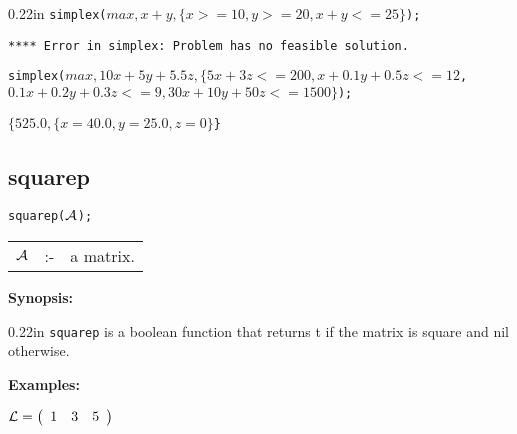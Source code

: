 \begin{addtolength}{\leftskip}{0.22in}
{\tt simplex($max,x+y,\{x>=10,y>=20,x+y<=25\}$);}

{\tt ***** Error in simplex: Problem has no feasible solution.}

\vspace*{0.2in}

\parbox[t]{0.96\linewidth}{\tt simplex($max,10x+5y+5.5z,\{5x+3z<=200,
x+0.1y+0.5z<=12$,\\
\hspace*{0.55in} $0.1x+0.2y+0.3z<=9, 30x+10y+50z<=1500\}$);}

\vspace*{0.1in}
{\tt $\{525.0,\{x=40.0,y=25.0,z=0\}$\}}

\end{addtolength}


\subsection{squarep}


\hspace*{0.175in} {\tt squarep(${\cal A}$);}

\hspace*{0.1in}  
\begin{tabular}{l l l} 
${\cal A}$ &:-& a matrix.
\end{tabular}

{\bf Synopsis:} %

\begin{addtolength}{\leftskip}{0.22in}
{\tt squarep} is a boolean function that returns t if 
                the matrix is square and nil otherwise.

\end{addtolength}

{\bf Examples:}

\begin{flushleft}
\hspace*{0.175in}
\begin{math}  
{\cal L} = \left( \begin{array}{ccc} 1 & 3 & 5 
\end{array} \right)
\end{math}  
\end{flushleft}

\vspace*{0.1in}

